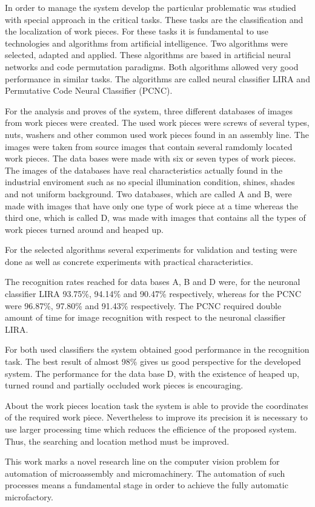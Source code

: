 In order to manage the system develop the particular problematic was studied with special approach in the critical tasks. These tasks are the classification and the localization of work pieces. For these tasks it is fundamental to use technologies and algorithms from artificial intelligence. Two algorithms were selected, adapted and applied. These algorithms are based in artificial neural networks and code permutation paradigms. Both algorithms allowed very good performance in similar tasks. The algorithms are called neural classifier LIRA and Permutative Code Neural Classifier (PCNC).

For the analysis and proves of the system, three different databases of images from work pieces were created. The used work pieces were screws of several types, nuts, washers and other common used work pieces found in an assembly line. The images were taken from source images that contain several ramdomly located work pieces. The data bases were made with six or seven types of work pieces. The images of the databases have real characteristics actually found in the industrial enviroment such as no special illumination condition, shines, shades and not uniform background. Two databases, which are called A and B, were made with images that have only one type of work piece at a time whereas the third one, which is called D, was made with images that contains all the types of work pieces turned around and heaped up.

For the selected algorithms several experiments for validation and testing were done as well as concrete experiments with practical characteristics. 

The recognition rates reached for data bases A, B and D were, for the neuronal classifier LIRA 93.75\%, 94.14\% and 90.47\% respectively, whereas for the PCNC were 96.87\%, 97.80\% and 91.43\% respectively. The PCNC required double amount of time for image recognition with respect to the neuronal classifier LIRA. 

For both used classifiers the system obtained good performance in the recognition task. The best result of almost 98\% gives us good perspective for the developed system. The performance for the data base D, with the existence of heaped up, turned round and partially occluded work pieces is encouraging.

About the work pieces location task the system is able to provide the coordinates of the required work piece. Nevertheless to improve its precision it is necessary to use larger processing time which reduces the efficience of the proposed system. Thus, the searching and location method must be improved.

This work marks a novel research line on the computer vision problem for automation of microassembly and micromachinery. The automation of such processes means a fundamental stage in order to achieve the fully automatic microfactory. 

